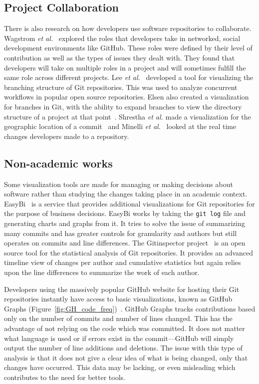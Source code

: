 \subsection{Project Collaboration}

There is also research on how developers use software repositories to collaborate. Wagstrom \textit{et al.}~\cite{Patrick:Wagstrom:2012} explored the roles that developers take in networked, social development environments like GitHub. These roles were defined by their level of contribution as well as the types of issues they dealt with. They found that developers will take on multiple roles in a project and will sometimes fulfill the same role across different projects. Lee \textit{et al.}~\cite{lee2013} developed a tool for visualizing the branching structure of Git repositories. This was used to analyze concurrent workflows in popular open source repositories. Elsen also created a visualization for branches in Git, with the ability to expand branches to view the directory structure of a project at that point~\cite{6650522}.   Shrestha \textit{et al.} made a visualization for the geographic location of a commit~\cite{6650532} and Minelli \textit{et al.}~\cite{6980226} looked at the real time changes developers made to a repository.

\subsection{Non-academic works}

Some visualization tools are made for managing or making decisions about software rather than studying the changes taking place in an academic context. EasyBi~\cite{EasyBi} is a service that provides additional visualizations for Git repositories for the purpose of business decisions. EasyBi works by taking the \texttt{git log} file and generating charts and graphs from it. It tries to solve the issue of summarizing many commits and has greater controls for granularity and authors but still operates on commits and line differences. The Gitinspector project~\cite{Gitinspector} is an open source tool for the statistical analysis of Git repositories. It provides an advanced timeline view of changes per author and cumulative statistics but again relies upon the line differences to summarize the work of each author.

Developers using the massively popular GitHub website for hosting their Git repositories instantly have access to basic visualizations, known as GitHub Graphs (Figure~\ref{fig:GH_code_freq})~\cite{github-graphs}. GitHub Graphs tracks contributions based only on the number of commits and number of lines changed. This has the advantage of not relying on the code which was committed. It does not matter what language is used or if errors exist in the commit---GitHub will simply output the number of line additions and deletions. The issue with this type of analysis is that it does not give a clear idea of what is being changed, only that changes have occurred. This data may be lacking, or even misleading which contributes to the need for better tools.

